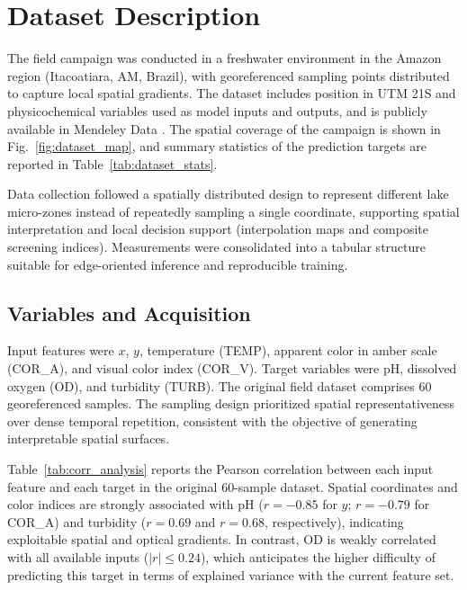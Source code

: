 \section{Dataset Description}

The field campaign was conducted in a freshwater environment in the Amazon region (Itacoatiara, AM, Brazil), with georeferenced sampling points distributed to capture local spatial gradients. The dataset includes position in UTM 21S and physicochemical variables used as model inputs and outputs, and is publicly available in Mendeley Data \cite{assuncao2026dataset}. The spatial coverage of the campaign is shown in Fig.~\ref{fig:dataset_map}, and summary statistics of the prediction targets are reported in Table~\ref{tab:dataset_stats}.

Data collection followed a spatially distributed design to represent different lake micro-zones instead of repeatedly sampling a single coordinate, supporting spatial interpretation and local decision support (interpolation maps and composite screening indices). Measurements were consolidated into a tabular structure suitable for edge-oriented inference and reproducible training.

\subsection{Variables and Acquisition}
Input features were $x$, $y$, temperature (TEMP), apparent color in amber scale (COR\_A), and visual color index (COR\_V). Target variables were pH, dissolved oxygen (OD), and turbidity (TURB). The original field dataset comprises 60 georeferenced samples. The sampling design prioritized spatial representativeness over dense temporal repetition, consistent with the objective of generating interpretable spatial surfaces.

Table~\ref{tab:corr_analysis} reports the Pearson correlation between each input feature and each target in the original 60-sample dataset. Spatial coordinates and color indices are strongly associated with pH ($r=-0.85$ for $y$; $r=-0.79$ for COR\_A) and turbidity ($r=0.69$ and $r=0.68$, respectively), indicating exploitable spatial and optical gradients. In contrast, OD is weakly correlated with all available inputs ($|r| \leq 0.24$), which anticipates the higher difficulty of predicting this target in terms of explained variance with the current feature set.

